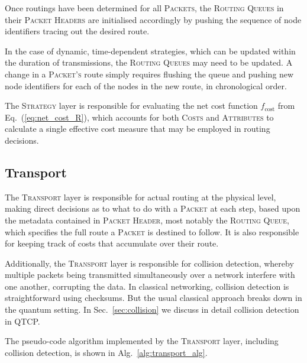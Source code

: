\documentclass[aps, rmp, twocolumn, amsmath, amssymb, nofootinbib, superscriptaddress, longbibliography, floatfix, table-of-contents, eqsecnum]{revtex4-1}
\begin{document}
Once routings have been determined for all \textsc{Packets}, the \textsc{Routing Queues} in their \textsc{Packet Headers} are initialised accordingly by pushing the sequence of node identifiers tracing out the desired route.

In the case of dynamic, time-dependent strategies, which can be updated within the duration of transmissions, the \textsc{Routing Queues} may need to be updated. A change in a \textsc{Packet's} route simply requires flushing the queue and pushing new node identifiers for each of the nodes in the new route, in chronological order.

The \textsc{Strategy} layer is responsible for evaluating the net cost function $f_\text{cost}$ from Eq.~(\ref{eq:net_cost_R}), which accounts for both \textsc{Costs} and \textsc{Attributes} to calculate a single effective cost measure that may be employed in routing decisions.

%
%

\subsection{Transport} \label{sec:transport} 

The \textsc{Transport} layer is responsible for actual routing at the physical level, making direct decisions as to what to do with a \textsc{Packet} at each step, based upon the metadata contained in \textsc{Packet Header}, most notably the \textsc{Routing Queue}, which specifies the full route a \textsc{Packet} is destined to follow. It is also responsible for keeping track of costs that accumulate over their route.

Additionally, the \textsc{Transport} layer is responsible for collision detection, whereby multiple packets being transmitted simultaneously over a network interfere with one another, corrupting the data. In classical networking, collision detection is straightforward using checksums. But the usual classical approach breaks down in the quantum setting. In Sec.~\ref{sec:collision} we discuss in detail collision detection in QTCP.

The pseudo-code algorithm implemented by the \textsc{Transport} layer, including collision detection, is shown in Alg.~\ref{alg:transport_alg}.
\end{document}

